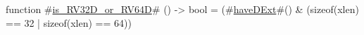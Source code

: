 function #\hyperref[sailRISCVziszyRV32DzyorzyRV64D]{is\_RV32D\_or\_RV64D}# () -> bool = (#\hyperref[sailRISCVzhaveDExt]{haveDExt}#() & (sizeof(xlen) == 32 | sizeof(xlen) == 64))
